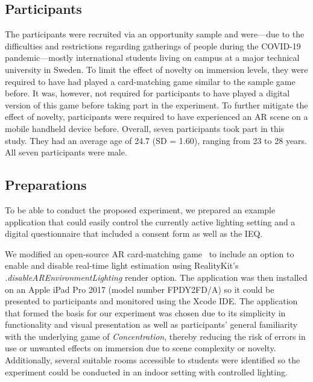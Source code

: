 \documentclass[12pt,twoside,english]{article}
\begin{document}
\subsection{Participants}
\label{sect:participants}

The participants were recruited via an opportunity sample and were---due to the difficulties and restrictions regarding gatherings of people during the COVID-19 pandemic---mostly international students living on campus at a major technical university in Sweden.
To limit the effect of novelty on immersion levels, they were required to have had played a card-matching game similar to the sample game before.
It was, however, not required for participants to have played a digital version of this game before taking part in the experiment.
To further mitigate the effect of novelty, participants were required to have experienced an \gls{AR} scene on a mobile handheld device before.
Overall, seven participants took part in this study.
They had an average age of 24.7 (SD = 1.60), ranging from 23 to 28 years.
All seven participants were male.

\subsection{Preparations}
\label{sect:preparations}

To be able to conduct the proposed experiment, we prepared an example application that could easily control the currently active lighting setting and a digital questionnaire that included a consent form as well as the \gls{IEQ}.

We modified an open-source \gls{AR} card-matching game~\cite{cobb_maxxfrazerrealitykit-cardflip_2020} to include an option to enable and disable real-time light estimation using RealityKit's \textit{.disableAREnvironmentLighting} render option.
The application was then installed on an Apple iPad Pro 2017 (model number FPDY2FD/A) so it could be presented to participants and monitored using the Xcode \gls{IDE}.
The application that formed the basis for our experiment was chosen due to its simplicity in functionality and visual presentation as well as participants' general familiarity with the underlying game of \textit{Concentration}, thereby reducing the risk of errors in use or unwanted effects on immersion due to scene complexity or novelty.
Additionally, several suitable rooms accessible to students were identified so the experiment could be conducted in an indoor setting with controlled lighting.
\end{document}
